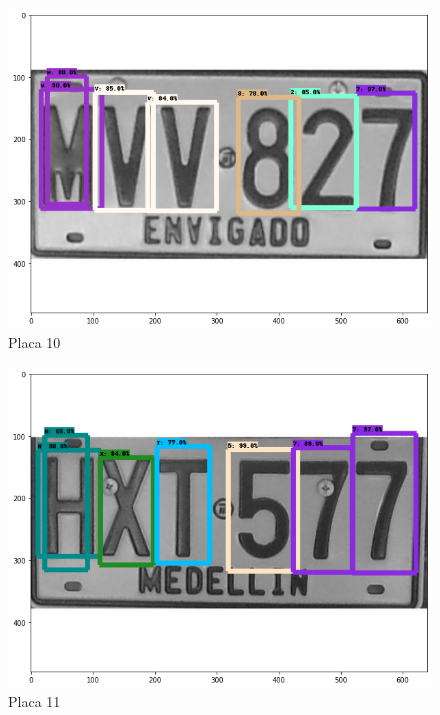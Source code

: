 \begin{figure}[H]
\centering
\includegraphics[width=0.4\linewidth]{imagenes/caracteres detectados/11.png}
\caption{Placa 10}
\label{fig:caracteres detectados p11}
\end{figure}

\begin{table}[H]
    \centering
    \caption{Detección de caracteres con porcentajes de acierto placa 10}
    \label{tab:p11}
\end{table}




\begin{figure}[H]
\centering
\includegraphics[width=0.4\linewidth]{imagenes/caracteres detectados/nuevo entrenamiento/3.png}
\caption{Placa 11}
\label{fig:caracteres detectados p13}
\end{figure}

